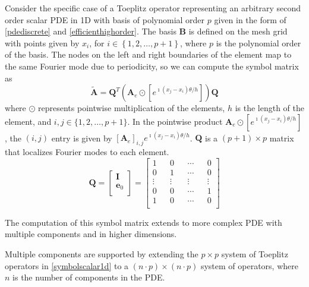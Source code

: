 \documentclass[review]{siamart190516}
\begin{document}
Consider the specific case of a Toeplitz operator representing an arbitrary second order scalar PDE in 1D with basis of polynomial order $p$ given in the form of \cref{pdediscrete} and \cref{efficienthighorder}.
The basis $\mathbf{B}$ is defined on the mesh grid with points given by $x_i$, for $i \in \left\lbrace 1, 2, \dots, p + 1 \right\rbrace$, where $p$ is the polynomial order of the basis.
The nodes on the left and right boundaries of the element map to the same Fourier mode due to periodicity, so we can compute the symbol matrix as
\begin{equation}\label{symbolscalar1d}
\tilde{\mathbf{A}} = \mathbf{Q}^T \left( \mathbf{A}_e \odot \left[ e^{\imath \left( x_j - x_i \right) \theta / h} \right] \right) \mathbf{Q}
\end{equation}
where $\odot$ represents pointwise multiplication of the elements, $h$ is the length of the element, and $i, j \in \lbrace 1, 2, \dots, p + 1 \rbrace$.
In the pointwise product $\mathbf{A}_e \odot \left[ e^{\imath \left( x_j - x_i \right) \theta / h} \right]$, the $\left( i, j \right)$ entry is given by $\left[ \mathbf{A}_e \right]_{i, j} e^{\imath \left( x_j - x_i \right) \theta / h}$.
$\mathbf{Q}$ is a $\left( p + 1 \right) \times p$ matrix that localizes Fourier modes to each element.
\begin{equation}
\mathbf{Q} =
\begin{bmatrix}
    \mathbf{I}   \\
    \mathbf{e}_0 \\
\end{bmatrix} =
\begin{bmatrix}
    1      && 0      && \cdots && 0      \\
    0      && 1      && \cdots && 0      \\
    \vdots && \vdots && \vdots && \vdots \\
    0      && 0      && \cdots && 1      \\
    1      && 0      && \cdots && 0      \\
\end{bmatrix}
\end{equation}

The computation of this symbol matrix extends to more complex PDE with multiple components and in higher dimensions.

Multiple components are supported by extending the $p \times p$ system of Toeplitz operators in \cref{symbolscalar1d} to a $\left( n \cdot p \right) \times \left( n \cdot p \right)$ system of operators, where $n$ is the number of components in the PDE.
\end{document}
